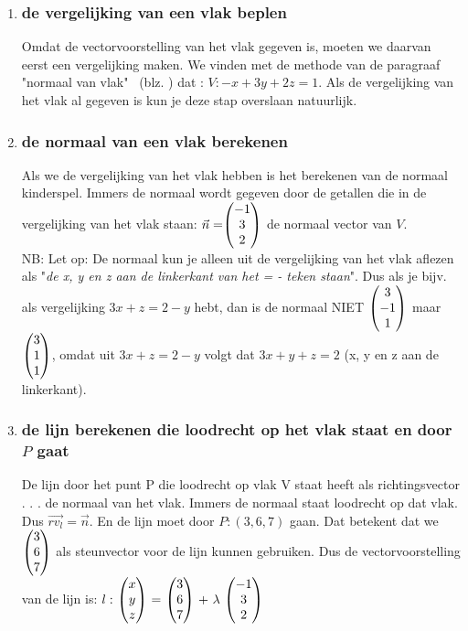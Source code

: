 
\begin{enumerate}[label=(\alph*)]
\item \subsubsection{de vergelijking van een vlak beplen}
Omdat de vectorvoorstelling van het vlak gegeven is, moeten we daarvan eerst een vergelijking maken.
We vinden met de methode van de paragraaf "normaal van vlak" \ 
(blz. \pageref{vlaknormaal}) dat : $ V: -x + 3y +2z = 1 $.  Als de vergelijking van het vlak al gegeven is kun je deze stap overslaan natuurlijk. 
\item \subsubsection{de normaal van een vlak berekenen}
Als we de vergelijking van het vlak hebben is het berekenen van de normaal kinderspel. Immers de normaal wordt gegeven door de getallen die in de vergelijking van het vlak staan:
$ \vec{n} = \vecdrie{-1}{3}{2}  $ de normaal vector van $ V $.\\
NB: Let op: De normaal kun je alleen uit de vergelijking van het vlak aflezen als "\textit{de x, y en z aan de linkerkant van het = - teken staan}".  Dus als je bijv. als vergelijking $ 3x + z = 2 -y $ hebt, dan is de normaal NIET $  \vecdrie{3}{-1}{1}  $ maar  $ \vecdrie{3}{1}{1}  $, omdat uit $ 3x + z = 2 -y $ volgt dat $ 3x + y + z = 2 $ (x, y en z aan de linkerkant).
\item \subsubsection{de lijn berekenen die  loodrecht op het vlak staat  en door $ P $ gaat}
De lijn door het punt P die loodrecht op vlak V staat heeft als richtingsvector . . .  de normaal van het vlak. Immers de normaal staat loodrecht op dat vlak. Dus $ \overrightarrow{rv_{l}}  = \vec{n} $. En de lijn moet door $ P: (3,6,7)  $  gaan. Dat  betekent dat we $ \vecdrie{3}{6}{7} $ als steunvector voor de lijn kunnen gebruiken. Dus de vectorvoorstelling van de lijn is: $ l: \ \vecdrie{x}{y}{z} \ = \ \vecdrie{3}{6}{7} \ + \ \lambda \ \vecdrie{-1}{3}{2} \ $

\end{enumerate}
